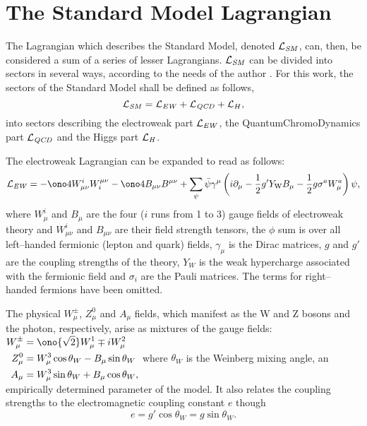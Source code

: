 \section{The Standard Model Lagrangian}

The Lagrangian which describes the Standard Model, denoted $\mathcal{L}_{\text{\emph{SM}}}$, can, then, be considered a sum of a series of lesser Lagrangians. $\mathcal{L}_{\text{\emph{SM}}}$ can be divided into sectors in several ways, according to the needs of the author \cite{srednicki,wikism}. For this work, the sectors of the Standard Model shall be defined as follows,
\[\mathcal{L}_{\text{\emph{SM}}}=\mathcal{L}_{\text{\emph{EW}}}+\mathcal{L}_{\text{\emph{QCD}}}+\mathcal{L}_{H},\]
into sectors describing the electroweak part $\mathcal{L}_{\text{\emph{EW}}}$, the QuantumChromoDynamics part $\mathcal{L}_{\text{\emph{QCD}}}$ and the Higgs part $\mathcal{L}_{\text{\emph{H}}}$.

The electroweak Lagrangian can be expanded to read as follows:
\[\mathcal{L}_\text{\emph{EW}}=-\ono4W^i_{\mu\nu}W_i^{\mu\nu}-\ono4B_{\mu\nu}B^{\mu\nu}+\sum_\psi\bar\psi\gamma^\mu \left(i\partial_\mu-{1\over2}g^\prime Y_\mathrm{W}B_\mu-{1\over2}g\sigma^a W^a_\mu\right)\psi,\]
where $W^i_{\mu}$ and $B_{\mu}$ are the four ($i$ runs from 1 to 3) gauge fields of electroweak theory and $W^i_{\mu\nu}$ and $B_{\mu\nu}$ are their field strength tensors, the $\phi$ sum is over all left--handed fermionic (lepton and quark) fields, $\gamma_{\mu}$ is the Dirac matrices, $g$ and $g'$ are the coupling strengths of the theory, $Y_W$ is the weak hypercharge associated with the fermionic field and $\sigma_i$ are the Pauli matrices. The terms for right--handed fermions have been omitted.

The physical $W^\pm_\mu$, $Z^0_\mu$ and $A_\mu$ fields, which manifest as the W and Z bosons and the photon, respectively, arise as mixtures of the gauge fields:
\(\begin{aligned}
W_\mu^\pm&=\ono{\sqrt{2}} W^1_\mu\mp iW^2_\mu\\
Z^0_\mu&=W^3_\mu\cos \theta_W-B_\mu\sin \theta_W\\
A_\mu&=W^3_\mu\sin\theta_W+B_\mu\cos\theta_W,
\end{aligned}\label{tophys}\)
where $\theta_W$ is the Weinberg mixing angle, an empirically determined parameter of the model. It also relates the coupling strengths to the electromagnetic coupling constant $e$ though
\[e=g'\cos\theta_W=g\sin\theta_W.\]

